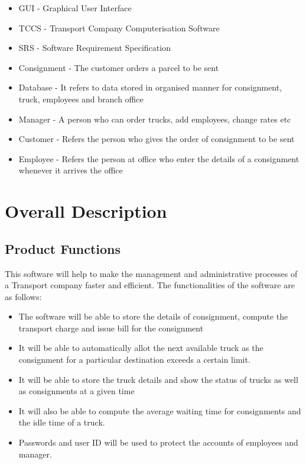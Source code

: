 \documentclass[english,openany,12pt,a4paper,dvipsnames]{book}
\begin{document}
        \begin{itemize}
          \item GUI - Graphical User Interface
          \item TCCS - Transport Company Computerisation Software
          \item SRS - Software Requirement Specification
          \item Consignment - The customer orders a parcel to be sent
          \item Database - It refers to data stored in organised manner for consignment, truck, employees and branch office
          \item Manager - A person who can order trucks, add employees, change rates etc
          \item Customer - Refers the person who gives the order of consignment to be sent
          \item Employee - Refers the person at office who enter the details of a consignment whenever it arrives the office
        \end{itemize}
\markboth{}{}

\section{Overall Description}
        \subsection{Product Functions}
        This software will help to make the management and administrative processes of a Transport
        company faster and efficient. The functionalities of the software are as follows:
                \begin{itemize}
                  \item The software will be able to store the details of consignment, compute the transport charge
                and issue bill for the consignment
                  \item It will be able to automatically allot the next available truck as the consignment for a
                particular destination exceeds a certain limit.
                  \item It will be able to store the truck details and show the status of trucks as well as consignments
                at a given time
                  \item It will also be able to compute the average waiting time for consignments and the idle time
                of a truck.
                  \item Passwords and user ID will be used to protect the accounts of employees and manager.
                \end{itemize}
                \markboth{}{}
\end{document}
